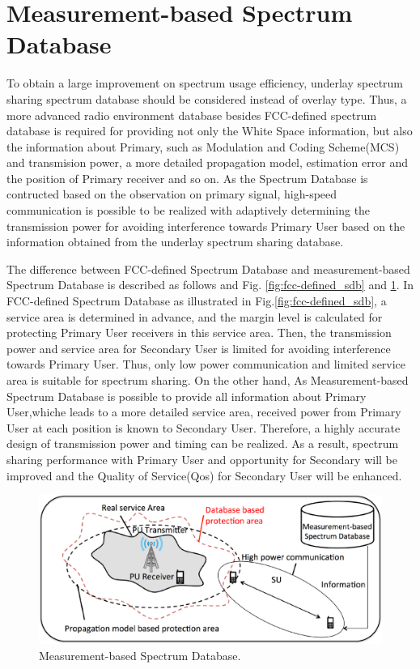 \section{Measurement-based Spectrum Database}
To obtain a large improvement on spectrum usage efficiency, underlay spectrum sharing spectrum database should be considered instead of overlay type. Thus, a more advanced radio environment database besides FCC-defined spectrum database is required for providing not only the White Space information, but also the information about Primary, such as Modulation and Coding Scheme(MCS) and transmision power, a more detailed propagation model, estimation error and the position of Primary receiver and so on. As the Spectrum Database is contructed based on the observation on primary signal, high-speed communication is possible to be realized  with adaptively determining the transmission power for avoiding interference towards Primary User based on the information obtained from the underlay spectrum sharing database.

The difference between FCC-defined Spectrum Database and measurement-based Spectrum Database is described as follows and Fig. \ref{fig:fcc-defined_sdb} and \ref{fig:asdb}. In FCC-defined Spectrum Database as illustrated in Fig.\ref{fig:fcc-defined_sdb}, a service area is determined in advance, and the margin level is calculated for protecting Primary User receivers in this service area. Then, the transmission power and service area for Secondary User is limited for avoiding interference towards Primary User. Thus, only low power communication and limited service area is suitable for spectrum sharing. On the other hand, As Measurement-based Spectrum Database is possible to provide all information about Primary User,whiche leads to a more detailed service area, received power from Primary User at each position is known to Secondary User. Therefore, a highly accurate design of transmission power and timing can be realized. As a result, spectrum sharing  performance with Primary User and opportunity for Secondary will be improved and the Quality of Service(Qos) for Secondary User will be enhanced. 

\begin{figure}[!htp]
\begin{center}
\includegraphics[width=120mm,clip]{asdb.eps}
\caption{Measurement-based Spectrum Database.}
\label{fig:asdb}
\end{center}
\end{figure}

